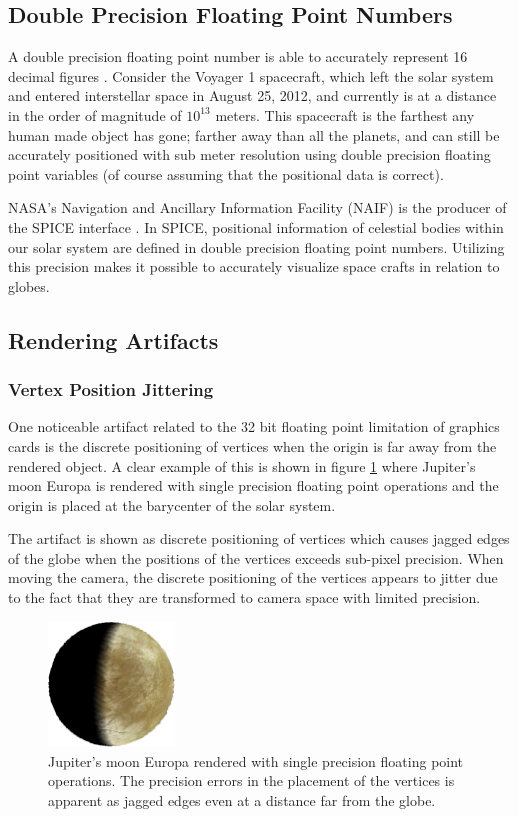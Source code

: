 \subsection{Double Precision Floating Point Numbers}

A double precision floating point number is able to accurately represent 16 decimal figures \cite{cozzi11}. Consider the Voyager 1 spacecraft, which left the solar system and entered interstellar space in August 25, 2012, and currently is at a distance in the order of magnitude of $10^{13}$ meters. This spacecraft is the farthest any human made object has gone; farther away than all the planets, and can still be accurately positioned with sub meter resolution using double precision floating point variables (of course assuming that the positional data is correct).

NASA's Navigation and Ancillary Information Facility (NAIF) is the producer of the SPICE interface \cite{spice}. In SPICE, positional information of celestial bodies within our solar system are defined in double precision floating point numbers. Utilizing this precision makes it possible to accurately visualize space crafts in relation to globes.

\subsection{Rendering Artifacts}
\subsubsection{Vertex Position Jittering}

One noticeable artifact related to the 32 bit floating point limitation of graphics cards is the discrete positioning of vertices when the origin is far away from the rendered object. A clear example of this is shown in figure \ref{fig:jittering} where Jupiter's moon Europa is rendered with single precision floating point operations and the origin is placed at the barycenter of the solar system.

The artifact is shown as discrete positioning of vertices which causes jagged edges of the globe when the positions of the vertices exceeds sub-pixel precision. When moving the camera, the discrete positioning of the vertices appears to jitter due to the fact that they are transformed to camera space with limited precision.

\begin{figure}[htbp]
    \centering
    \includegraphics[width=0.3\textwidth]{figures/europa.png}
    \caption{Jupiter's moon Europa rendered with single precision floating point operations. The precision errors in the placement of the vertices is apparent as jagged edges even at a distance far from the globe.}
    \label{fig:jittering}
\end{figure}

